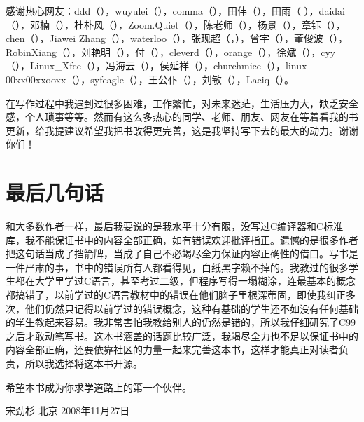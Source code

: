 感谢热心网友：ddd（），wuyulei（），comma（），田伟（），田雨（ ），daidai（），邓楠（），杜朴风（），Zoom.Quiet（），陈老师（），杨景（），章钰（），chen（），Jiawei Zhang（），waterloo（），张现超（，），曾宇（），董俊波（），RobinXiang（），刘艳明（），付（），cleverd（），orange（），徐斌（），cyy（），Linux\_Xfce（），冯海云（），侯延祥（），churchmice（），linux——00xx00xxooxx（），syfeagle（），王公仆（），刘敏（），Laciq（）。



在写作过程中我遇到过很多困难，工作繁忙，对未来迷茫，生活压力大，缺乏安全感，个人琐事等等。然而有这么多热心的同学、老师、朋友、网友在等着看我的书更新，给我提建议希望我把书改得更完善，这是我坚持写下去的最大的动力。谢谢你们！


\section*{最后几句话}
%


和大多数作者一样，最后我要说的是我水平十分有限，没写过C编译器和C标准库，我不能保证书中的内容全部正确，如有错误欢迎批评指正。遗憾的是很多作者把这句话当成了挡箭牌，当成了自己不必竭尽全力保证内容正确性的借口。写书是一件严肃的事，书中的错误所有人都看得见，白纸黑字赖不掉的。我教过的很多学生都在大学里学过C语言，甚至考过二级，但程序写得一塌糊涂，连最基本的概念都搞错了，以前学过的C语言教材中的错误在他们脑子里根深蒂固，即使我纠正多次，他们仍然只记得以前学过的错误概念，这种有基础的学生还不如没有任何基础的学生教起来容易。我非常害怕我教给别人的仍然是错的，所以我仔细研究了C99之后才敢动笔写书。这本书涵盖的话题比较广泛，我竭尽全力也不足以保证书中的内容全部正确，还要依靠社区的力量一起来完善这本书，这样才能真正对读者负责，所以我选择将这本书开源。



希望本书成为你求学道路上的第一个伙伴。



宋劲杉 北京 2008年11月27日

